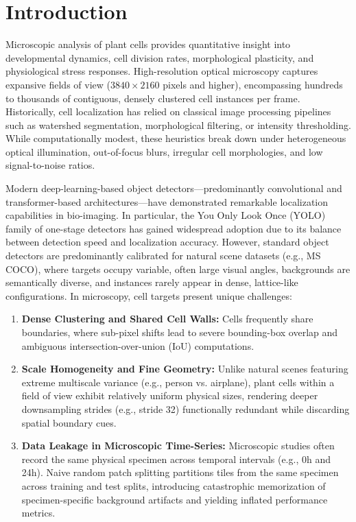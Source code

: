 \documentclass[conference]{IEEEtran}
\begin{document}
\section{Introduction}
Microscopic analysis of plant cells provides quantitative insight into developmental dynamics, cell division rates, morphological plasticity, and physiological stress responses. High-resolution optical microscopy captures expansive fields of view ($3840 \times 2160$ pixels and higher), encompassing hundreds to thousands of contiguous, densely clustered cell instances per frame. Historically, cell localization has relied on classical image processing pipelines such as watershed segmentation, morphological filtering, or intensity thresholding. While computationally modest, these heuristics break down under heterogeneous optical illumination, out-of-focus blurs, irregular cell morphologies, and low signal-to-noise ratios.

Modern deep-learning-based object detectors---predominantly convolutional and transformer-based architectures---have demonstrated remarkable localization capabilities in bio-imaging. In particular, the You Only Look Once (YOLO) family of one-stage detectors has gained widespread adoption due to its balance between detection speed and localization accuracy. However, standard object detectors are predominantly calibrated for natural scene datasets (e.g., MS COCO), where targets occupy variable, often large visual angles, backgrounds are semantically diverse, and instances rarely appear in dense, lattice-like configurations. In microscopy, cell targets present unique challenges:
\begin{enumerate}
    \item \textbf{Dense Clustering and Shared Cell Walls:} Cells frequently share boundaries, where sub-pixel shifts lead to severe bounding-box overlap and ambiguous intersection-over-union (IoU) computations.
    \item \textbf{Scale Homogeneity and Fine Geometry:} Unlike natural scenes featuring extreme multiscale variance (e.g., person vs. airplane), plant cells within a field of view exhibit relatively uniform physical sizes, rendering deeper downsampling strides (e.g., stride 32) functionally redundant while discarding spatial boundary cues.
    \item \textbf{Data Leakage in Microscopic Time-Series:} Microscopic studies often record the same physical specimen across temporal intervals (e.g., 0h and 24h). Naive random patch splitting partitions tiles from the same specimen across training and test splits, introducing catastrophic memorization of specimen-specific background artifacts and yielding inflated performance metrics.
\end{enumerate}
\end{document}
